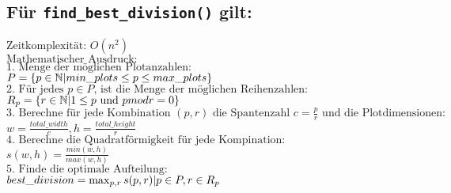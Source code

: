 \documentclass[a4paper,10pt,ngerman]{scrartcl}
\begin{document}
\subsection{Für \texttt{find\_best\_division()} gilt:}
$\text{Zeitkomplexität: } O(n^{2})$\\
$\text{Mathematischer Ausdruck: }$\\
$\text{1. Menge der möglichen Plotanzahlen:}$\\
$P=\{p \in \mathbb{N} \space| \space min\_plots \leq p\leq max\_plots\}$
$\text{2. Für jedes } p \in P \text{, ist die Menge der möglichen Reihenzahlen:}$\\
$R_{p}=\{r \in \mathbb{N} \space| \space 1 \leq p \text{ und }p \space mod \space r = 0 \}$\\$\text{3. Berechne für jede Kombination } (p,r) \text{ die Spantenzahl } c=\frac{p}{r} \text{ und die Plotdimensionen: }$\\$w=\frac{total\_width}{c}, h=\frac{total\_height}{r}$\\
$\text{4. Berechne die Quadratförmigkeit für jede Kompination: }$\\
$s(w,h)=\frac{min(w, h)}{max(w, h)}$\\
$\text{5. Finde die optimale Aufteilung: }$\\
$best\_division=\max_{p,r}{s(p,r)}\space |\space p\in P, r\in R_{p}$
\end{document}
